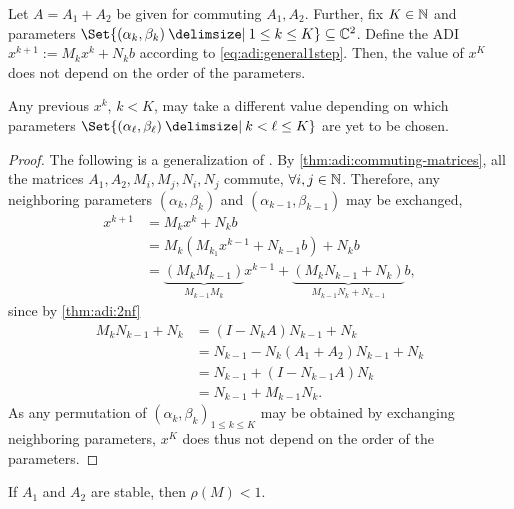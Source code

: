 \begin{proposition}
  Let $A=A_1 + A_2$ be given for commuting $A_1,A_2$.
  Further, fix $K\in\mathbb{N}$ and parameters $\Set{(\alpha_k, \beta_k) \given 1 \leq k \leq K} \subseteq \C^2$.
  Define the \ac{ADI} $x^{k+1} := M_k x^k + N_k b$ according to \eqref{eq:adi:general1step}.
  Then, the value of $x^K$ does not depend on the order of the parameters.
\end{proposition}
\begin{remark}
  Any previous $x^k$, $k < K$, may take a different value depending on which parameters
  $\Set{(\alpha_\ell,\beta_\ell) \given k < \ell \leq K}$ are yet to be chosen.
\end{remark}
\begin{proof}
  The following is a generalization of \cite[proof of Theorem~4.1]{Li2002}.
  By \autoref{thm:adi:commuting-matrices}, all the matrices $A_1, A_2, M_i, M_j, N_i, N_j$ commute, $\forall i,j\in\mathbb{N}$.
  Therefore, any neighboring parameters $(\alpha_k,\beta_k)$ and $(\alpha_{k-1},\beta_{k-1})$ may be exchanged,
  \begin{align*}
    x^{k+1}
    &= M_k x^k + N_k b \\
    &= M_k (M_{k_1} x^{k-1} + N_{k-1} b) + N_k b \\
    &= \underbrace{
      (M_k M_{k-1})
    }_{
      M_{k-1} M_k
    } x^{k-1} + \underbrace{
      (M_k N_{k-1} + N_k)
    }_{
      M_{k-1} N_k + N_{k-1}
    } b
    ,
  \end{align*}
  since by \autoref{thm:adi:2nf}
  \begin{align*}
    M_k N_{k-1} + N_k
    &= (I - N_k A)N_{k-1} + N_k \\
    &= N_{k-1} - N_k (A_1+A_2) N_{k-1} + N_k \\
    &= N_{k-1} + (I - N_{k-1} A) N_k \\
    &= N_{k-1} + M_{k-1} N_k
    .
  \end{align*}
  As any permutation of $(\alpha_k,\beta_k)_{1\leq k \leq K}$ may be obtained by exchanging neighboring parameters,
  $x^K$ does thus not depend on the order of the parameters.
\end{proof}


\begin{hypothesis}
\label{thm:adi:convergence}
  If $A_1$ and $A_2$ are stable, then $\rho(M) < 1$.
\end{hypothesis}

